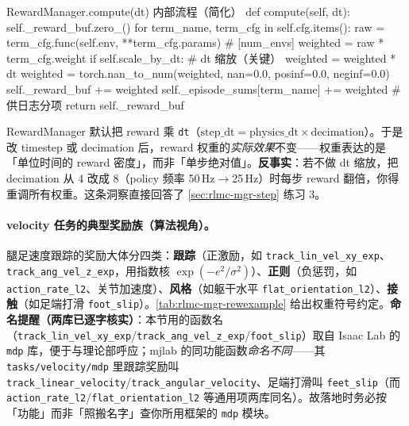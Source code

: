 \begin{codebox}[Python]{RewardManager.compute(dt) 内部流程（简化）}
def compute(self, dt):
    self._reward_buf.zero_()
    for term_name, term_cfg in self.cfg.items():
        raw = term_cfg.func(self.env, **term_cfg.params)   # [num_envs]
        weighted = raw * term_cfg.weight
        if self.scale_by_dt:                               # dt 缩放（关键）
            weighted = weighted * dt
        weighted = torch.nan_to_num(weighted, nan=0.0, posinf=0.0, neginf=0.0)
        self._reward_buf += weighted
        self._episode_sums[term_name] += weighted          # 供日志分项
    return self._reward_buf
\end{codebox}

\begin{insight}\label{ins:rlmc-mgr-dtscale}
RewardManager 默认把 reward 乘 \verb|dt|（$\text{step\_dt}=\text{physics\_dt}\times\text{decimation}$）。于是改 timestep 或 decimation 后，reward 权重的\emph{实际效果}不变——权重表达的是「单位时间的 reward 密度」，而非「单步绝对值」。\textbf{反事实}：若不做 dt 缩放，把 decimation 从 4 改成 8（policy 频率 50\,Hz$\to$25\,Hz）时每步 reward 翻倍，你得重调所有权重。这条洞察直接回答了 \cref{sec:rlmc-mgr-step} 练习 3。
\end{insight}

\paragraph{velocity 任务的典型奖励族（算法视角）。}腿足速度跟踪的奖励大体分四类：\textbf{跟踪}（正激励，如 \verb|track_lin_vel_xy_exp|、\verb|track_ang_vel_z_exp|，用指数核 $\exp(-e^2/\sigma^2)$）、\textbf{正则}（负惩罚，如 \verb|action_rate_l2|、关节加速度）、\textbf{风格}（如躯干水平 \verb|flat_orientation_l2|）、\textbf{接触}（如足端打滑 \verb|foot_slip|）。\cref{tab:rlmc-mgr-rewexample} 给出权重符号约定。\textbf{命名提醒（两库已逐字核实）}：本节用的函数名（\texttt{track\_lin\_vel\_xy\_exp}/\texttt{track\_ang\_vel\_z\_exp}/\texttt{foot\_slip}）取自 Isaac Lab 的 \texttt{mdp} 库，便于与理论部呼应；mjlab 的同功能函数\emph{命名不同}——其 \texttt{tasks/velocity/mdp} 里跟踪奖励叫 \texttt{track\_linear\_velocity}/\texttt{track\_angular\_velocity}、足端打滑叫 \texttt{feet\_slip}（而 \texttt{action\_rate\_l2}/\texttt{flat\_orientation\_l2} 等通用项两库同名）。故落地时务必按「功能」而非「照搬名字」查你所用框架的 \texttt{mdp} 模块。

